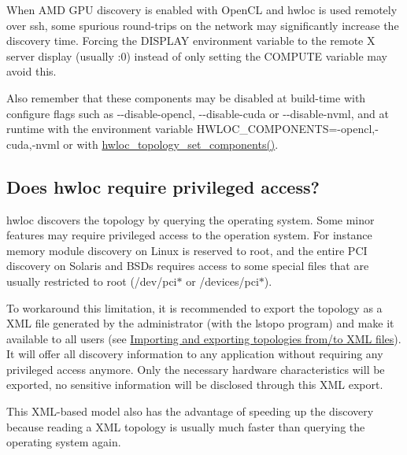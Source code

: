 When A\+MD G\+PU discovery is enabled with Open\+CL and hwloc is used remotely over ssh, some spurious round-\/trips on the network may significantly increase the discovery time. Forcing the {\ttfamily D\+I\+S\+P\+L\+AY} environment variable to the remote X server display (usually {\ttfamily \+:0}) instead of only setting the {\ttfamily C\+O\+M\+P\+U\+TE} variable may avoid this.

Also remember that these components may be disabled at build-\/time with configure flags such as {\ttfamily -\/-\/disable-\/opencl}, {\ttfamily -\/-\/disable-\/cuda} or {\ttfamily -\/-\/disable-\/nvml}, and at runtime with the environment variable {\ttfamily H\+W\+L\+O\+C\+\_\+\+C\+O\+M\+P\+O\+N\+E\+N\+TS=-\/opencl,-\/cuda,-\/nvml} or with \hyperlink{a00192_ga9ad41adf418cee1c0ee32ba9bd4a3d36}{hwloc\+\_\+topology\+\_\+set\+\_\+components()}.\hypertarget{a00394_faq_privileged}{}\subsection{Does hwloc require privileged access?}\label{a00394_faq_privileged}
hwloc discovers the topology by querying the operating system. Some minor features may require privileged access to the operation system. For instance memory module discovery on Linux is reserved to root, and the entire P\+CI discovery on Solaris and B\+S\+Ds requires access to some special files that are usually restricted to root (/dev/pci$\ast$ or /devices/pci$\ast$).

To workaround this limitation, it is recommended to export the topology as a X\+ML file generated by the administrator (with the lstopo program) and make it available to all users (see \hyperlink{a00388}{Importing and exporting topologies from/to X\+ML files}). It will offer all discovery information to any application without requiring any privileged access anymore. Only the necessary hardware characteristics will be exported, no sensitive information will be disclosed through this X\+ML export.

This X\+M\+L-\/based model also has the advantage of speeding up the discovery because reading a X\+ML topology is usually much faster than querying the operating system again.

